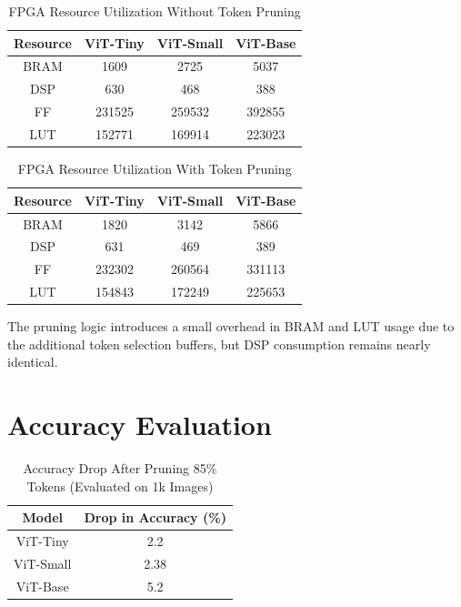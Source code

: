 \begin{table}[h!]
\centering
\caption{FPGA Resource Utilization Without Token Pruning}
\begin{tabular}{|c|c|c|c|}
\hline
\textbf{Resource} & \textbf{ViT-Tiny} & \textbf{ViT-Small} & \textbf{ViT-Base} \\ \hline
BRAM & 1609 & 2725 & 5037 \\ \hline
DSP  & 630  & 468  & 388 \\ \hline
FF   & 231525 & 259532 & 392855 \\ \hline
LUT  & 152771 & 169914 & 223023 \\ \hline
\end{tabular}
\label{table:resources_without_pruning}
\end{table}




\begin{table}[h!]
\centering
\caption{FPGA Resource Utilization With Token Pruning}
\begin{tabular}{|c|c|c|c|}
\hline
\textbf{Resource} & \textbf{ViT-Tiny} & \textbf{ViT-Small} & \textbf{ViT-Base} \\ \hline
BRAM & 1820 & 3142 & 5866 \\ \hline
DSP  & 631  & 469  & 389  \\ \hline
FF   & 232302 & 260564 & 331113 \\ \hline
LUT  & 154843 & 172249 & 225653 \\ \hline
\end{tabular}
\label{table:resources_with_pruning}
\end{table}

The pruning logic introduces a small overhead in BRAM and LUT usage due to the additional token selection buffers, but DSP consumption remains nearly identical.


\section{Accuracy Evaluation}

\begin{table}[h!]
\centering
\caption{Accuracy Drop After Pruning 85\% Tokens (Evaluated on 1k Images)}
\begin{tabular}{|c|c|}
\hline
\textbf{Model} & \textbf{Drop in Accuracy (\%)} \\ \hline
ViT-Tiny  & 2.2  \\ \hline
ViT-Small & 2.38 \\ \hline
ViT-Base  & 5.2  \\ \hline
\end{tabular}
\end{table}

